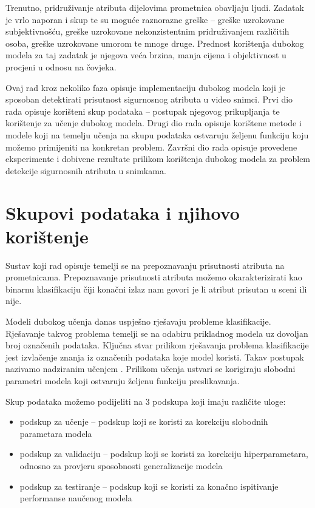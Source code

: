 \documentclass[times, utf8, diplomski, numeric]{fer}
\begin{document}
Trenutno, pridruživanje atributa dijelovima prometnica obavljaju ljudi. 
Zadatak je vrlo naporan i skup te su moguće raznorazne greške -- greške uzrokovane subjektivnošću, greške uzrokovane nekonzistentnim pridruživanjem različitih osoba, greške uzrokovane umorom te mnoge druge.
Prednost korištenja dubokog modela za taj zadatak je njegova veća brzina, manja cijena i objektivnost u procjeni u odnosu na čovjeka.

Ovaj rad kroz nekoliko faza opisuje implementaciju dubokog modela koji je sposoban detektirati prisutnost sigurnosnog atributa u video snimci.
Prvi dio rada opisuje korišteni skup podataka -- postupak njegovog prikupljanja te korištenje za učenje dubokog modela.
Drugi dio rada opisuje korištene metode i modele koji na temelju učenja na skupu podataka ostvaruju željenu funkciju koju možemo primijeniti na konkretan problem.
Završni dio rada opisuje provedene eksperimente i dobivene rezultate prilikom korištenja dubokog modela za problem detekcije sigurnosnih atributa u snimkama.


\chapter{Skupovi podataka i njihovo korištenje} \label{chapter:skupovi_podataka}

Sustav koji rad opisuje temelji se na prepoznavanju prisutnosti atributa na prometnicama. 
Prepoznavanje prisutnosti atributa možemo okarakterizirati kao binarnu klasifikaciju čiji konačni izlaz nam govori je li atribut prisutan u sceni ili nije.

Modeli dubokog učenja danas uspješno rješavaju probleme klasifikacije. Rješavanje takvog problema temelji se na odabiru prikladnog modela uz dovoljan broj označenih podataka. 
Ključna stvar prilikom rješavanja problema klasifikacije jest izvlačenje znanja iz označenih podataka koje model koristi. Takav postupak nazivamo nadziranim učenjem \citep{book:deeplearningbook}. 
Prilikom učenja ustvari se korigiraju slobodni parametri modela koji ostvaruju željenu funkciju preslikavanja.

Skup podataka možemo podijeliti na 3 podskupa koji imaju različite uloge:
\begin{itemize}
 \item podskup za učenje -- podskup koji se koristi za korekciju slobodnih parametara modela
 \item podskup za validaciju -- podskup koji se koristi za korekciju hiperparametara, odnosno za provjeru sposobnosti generalizacije modela
 \item podskup za testiranje -- podskup koji se koristi za konačno ispitivanje performanse naučenog modela
\end{itemize}
\end{document}
